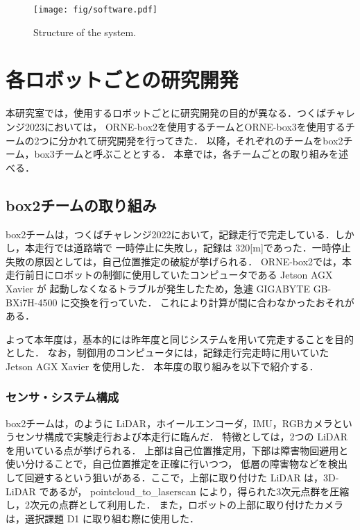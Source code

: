 \documentclass[twocolumn, 9pt]{jsproceedings}
\begin{document}
\begin{figure}[h!]
  \centering
  \texttt{[image: fig/software.pdf]}
  \caption{Structure of the system.}
  \label{fig:soft-fig}
\end{figure}

\vspace*{2mm}

\section{各ロボットごとの研究開発}
本研究室では，使用するロボットごとに研究開発の目的が異なる．つくばチャレンジ2023においては，
ORNE-box2を使用するチームとORNE-box3を使用するチームの2つに分かれて研究開発を行ってきた．
以降，それぞれのチームをbox2チーム，box3チームと呼ぶこととする．
本章では，各チームごとの取り組みを述べる．

\subsection{box2チームの取り組み}
box2チームは，つくばチャレンジ2022において，記録走行で完走している．しかし，本走行では道路端で
一時停止に失敗し，記録は 320[m]であった．一時停止失敗の原因としては，自己位置推定の破綻が挙げられる．
ORNE-box2では，本走行前日にロボットの制御に使用していたコンピュータである Jetson AGX Xavier が
起動しなくなるトラブルが発生したため，急遽 GIGABYTE GB-BXi7H-4500 に交換を行っていた．
これにより計算が間に合わなかったおそれがある．

よって本年度は，基本的には昨年度と同じシステムを用いて完走することを目的とした．
なお，制御用のコンピュータには，記録走行完走時に用いていた Jetson AGX Xavier を使用した．
本年度の取り組みを以下で紹介する．

\subsubsection{センサ・システム構成}
box2チームは，のように LiDAR，ホイールエンコーダ，IMU，RGBカメラというセンサ構成で実験走行および本走行に臨んだ．
特徴としては，2つの LiDAR を用いている点が挙げられる．
上部は自己位置推定用，下部は障害物回避用と使い分けることで，自己位置推定を正確に行いつつ，
低層の障害物などを検出して回避するという狙いがある．ここで，上部に取り付けた LiDAR は，3D-LiDAR であるが，
pointcloud\_to\_laserscan\cite{pointcloud} により，得られた3次元点群を圧縮し，2次元の点群として利用した．
また，ロボットの上部に取り付けたカメラは，選択課題 D1 に取り組む際に使用した．\\
\end{document}
